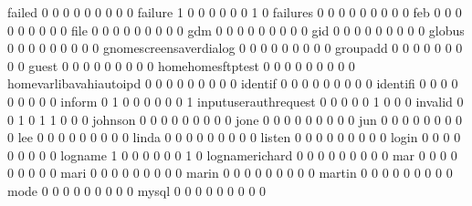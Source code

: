 \documentclass[compress,8pt]{beamer}
\begin{document}
\begin{frame}
\begin{Schunk}
  failed                                     0   0   0   0   0   0   0   0   0
  failure                                    1   0   0   0   0   0   0   1   0
  failures                                   0   0   0   0   0   0   0   0   0
  feb                                        0   0   0   0   0   0   0   0   0
  file                                       0   0   0   0   0   0   0   0   0
  gdm                                        0   0   0   0   0   0   0   0   0
  gid                                        0   0   0   0   0   0   0   0   0
  globus                                     0   0   0   0   0   0   0   0   0
  gnomescreensaverdialog                     0   0   0   0   0   0   0   0   0
  groupadd                                   0   0   0   0   0   0   0   0   0
  guest                                      0   0   0   0   0   0   0   0   0
  homehomesftptest                           0   0   0   0   0   0   0   0   0
  homevarlibavahiautoipd                     0   0   0   0   0   0   0   0   0
  identif                                    0   0   0   0   0   0   0   0   0
  identifi                                   0   0   0   0   0   0   0   0   0
  inform                                     0   1   0   0   0   0   0   0   1
  inputuserauthrequest                       0   0   0   0   0   1   0   0   0
  invalid                                    0   0   1   0   1   1   0   0   0
  johnson                                    0   0   0   0   0   0   0   0   0
  jone                                       0   0   0   0   0   0   0   0   0
  jun                                        0   0   0   0   0   0   0   0   0
  lee                                        0   0   0   0   0   0   0   0   0
  linda                                      0   0   0   0   0   0   0   0   0
  listen                                     0   0   0   0   0   0   0   0   0
  login                                      0   0   0   0   0   0   0   0   0
  logname                                    1   0   0   0   0   0   0   1   0
  lognamerichard                             0   0   0   0   0   0   0   0   0
  mar                                        0   0   0   0   0   0   0   0   0
  mari                                       0   0   0   0   0   0   0   0   0
  marin                                      0   0   0   0   0   0   0   0   0
  martin                                     0   0   0   0   0   0   0   0   0
  mode                                       0   0   0   0   0   0   0   0   0
  mysql                                      0   0   0   0   0   0   0   0   0

\end{Schunk}
\end{frame}
\end{document}
